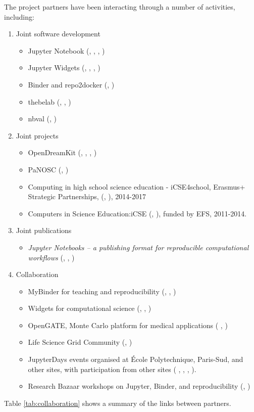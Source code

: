 The project partners have been interacting through a number of
activities, including:

\begin{enumerate}
\item Joint software development
  \begin{itemize}
  \item Jupyter Notebook (, , , )
  \item Jupyter Widgets (, , , )
  \item Binder and repo2docker (, )
  \item thebelab (, , )
  \item nbval (, )
  \end{itemize}

\item Joint projects
  \begin{itemize}
  \item OpenDreamKit (, , , )
  \item PaNOSC (, )
  \item Computing in high school science education - iCSE4school, Erasmus+ Strategic Partnerships,
  (, ), 2014-2017
  \item Computers in Science Education:iCSE (, ), funded by EFS, 2011-2014.
    \end{itemize}

\item Joint publications
  \begin{itemize}
  \item \emph{Jupyter Notebooks -- a publishing format for
      reproducible computational workflows} \cite{Kluyver2016} (, , )
  \end{itemize}

\item Collaboration
  \begin{itemize}
  \item MyBinder for teaching and reproducibility (, , )
  \item Widgets for computational science (, , )
  \item OpenGATE, Monte Carlo platform for medical applications (
    , )
  \item Life Science Grid Community (, )
  \item JupyterDays events organised at \'Ecole Polytechnique, Paris-Sud,
  and other sites, with participation from other sites (
  , , , ).
  \item Research Bazaar workshops on Jupyter, Binder, and reproducibility
    (, )
 \end{itemize}
\end{enumerate}

Table \ref{tab:collaboration} shows a summary of the links
between partners.


